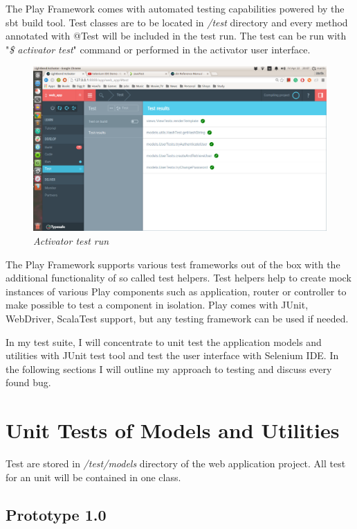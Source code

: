 \documentclass[12pt,twoside,a4paper]{report}
\begin{document}
The Play Framework comes with automated testing capabilities powered by the sbt build tool. Test classes are to be located in \emph{/test} directory and every method annotated with @Test will be included in the test run. The test can be run with "\emph{\$ activator test}" command or performed in the activator user interface.

\begin{figure}[!ht]
	\centering
		\includegraphics[width=1\textwidth, totalheight=9cm]
		{activator_test_run}
	\caption{\textit{Activator test run}}
	\label{f4.1.1}
\end{figure}

The Play Framework supports various test frameworks out of the box with the additional functionality of so called test helpers. Test helpers help to create mock instances of various Play components such as application, router or controller to make possible to test a component in isolation. Play comes with JUnit, WebDriver, ScalaTest support, but any testing framework can be used if needed.

In my test suite, I will concentrate to unit test the application models and utilities with JUnit test tool and test the user interface with Selenium IDE. In the following sections I will outline my approach to testing and discuss every found bug.

\section{Unit Tests of Models and Utilities}\label{5.2}
Test are stored in \emph{/test/models} directory of the web application project. All test for an unit will be contained in one class.

\subsection{Prototype 1.0}\label{5.2.1}
\end{document}
